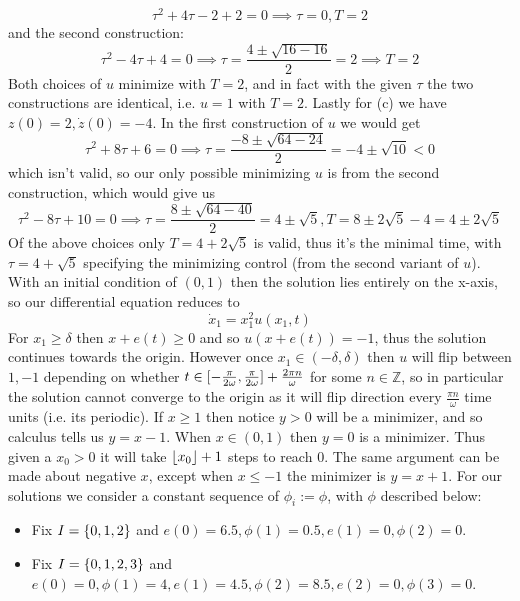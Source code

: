 \documentclass{article}
\newenvironment{ex}[1]
  {\renewcommand\theexercise{#1}\exercise}
  {\endexercise}
\begin{document}
\begin{ex}{1.2}
  $$
  \tau^2 + 4\tau - 2 + 2 = 0 \implies \tau = 0, T = 2
  $$
  and the second construction:
  $$
  \tau^2 - 4\tau + 4 = 0 \implies \tau = \frac{4 \pm \sqrt{16 - 16}}{2} = 2 \implies T = 2
  $$
  Both choices of $u$ minimize with $T = 2$, and in fact with the given $\tau$ the two constructions are identical, i.e. $u = 1$ with $T = 2$. Lastly for (c) we have $z(0) = 2, \dot{z}(0) = -4$. In the first construction of $u$ we would get
  $$
  \tau^2 + 8 \tau + 6 = 0 \implies \tau = \frac{-8 \pm \sqrt{64 - 24}}{2} = -4 \pm \sqrt{10} < 0
  $$
  which isn't valid, so our only possible minimizing $u$ is from the second construction, which would give us
  $$
  \tau^2 - 8\tau + 10 = 0 \implies \tau = \frac{8 \pm \sqrt{64 - 40}}{2} = 4 \pm \sqrt{5}, T = 8 \pm 2\sqrt{5} - 4 = 4 \pm 2\sqrt{5}
  $$
  Of the above choices only $T = 4 + 2\sqrt{5}$ is valid, thus it's the minimal time, with $\tau = 4 + \sqrt{5}$ specifying the minimizing control (from the second variant of $u$).
\end{ex}
\begin{ex}{1.5}
  With an initial condition of $(0, 1)$ then the solution lies entirely on the x-axis, so our differential equation reduces to
  $$
  \dot{x}_1 = x_1^2 u(x_1, t)
  $$
  For $x_1 \ge \delta$ then $x + e(t) \ge 0$ and so $u(x + e(t)) = -1$, thus the solution continues towards the origin. However once $x_1 \in (-\delta, \delta)$ then $u$ will flip between $1, -1$ depending on whether $t \in [-\frac{\pi}{2\omega}, \frac{\pi}{2\omega}] + \frac{2\pi n}{\omega}$ for some $n \in \mathbb{Z}$, so in particular the solution cannot converge to the origin as it will flip direction every $\frac{\pi n}{\omega}$ time units (i.e. its periodic).
\end{ex}
\begin{ex}{1.7}
  If $x \ge 1$ then notice $y > 0$ will be a minimizer, and so calculus tells us $y = x - 1$. When $x \in (0, 1)$ then $y = 0$ is a minimizer. Thus given a $x_0 > 0$ it will take $\lfloor x_0\rfloor + 1$ steps to reach $0$. The same argument can be made about negative $x$, except when $x \le -1$ the minimizer is $y = x + 1$.
\end{ex}
\begin{ex}{1.8}
  For our solutions we consider a constant sequence of $\phi_i := \phi$, with $\phi$ described below:
  \begin{itemize}
    \item
      Fix $I = \{0, 1, 2\}$ and $e(0) = 6.5, \phi(1) = 0.5, e(1) = 0, \phi(2) = 0$.
    \item
      Fix $I = \{0, 1, 2, 3\}$ and $e(0) = 0, \phi(1) = 4, e(1) = 4.5, \phi(2) = 8.5, e(2) = 0, \phi(3) = 0$.
  \end{itemize}
\end{ex}
\end{document}
